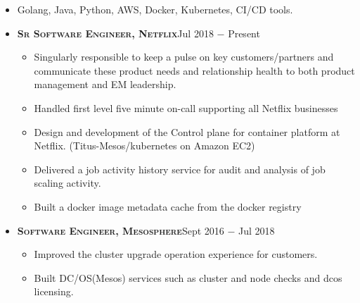 \documentclass[10pt,oneside]{article}
\newcommand{\subheader}[1]{\textsc{\textbf{\large{#1}}}}
\begin{document}
{\flushleft{\subheader{Skills}} %
      \vspace{-4 pt}

   \begin{itemize}
       \item Golang, Java, Python, AWS, Docker, Kubernetes, CI/CD tools.
   \end{itemize}

{\flushleft{\subheader{Experience}} %
\begin{itemize}
      \item
      \subheader{Sr Software Engineer, Netflix}\hfill Jul 2018 $-$ Present\\
      \vspace{-4 pt}
      \begin{itemize}
          \item Singularly responsible to keep a pulse on key customers/partners and communicate these product needs and relationship health to both product management and EM leadership.
          \item Handled first level five minute on-call supporting all Netflix businesses
          \item Design and development of the Control plane for container platform at Netflix. (Titus-Mesos/kubernetes on Amazon EC2)
          \item Delivered a job activity history service for audit and analysis of job scaling activity.
          \item Built a docker image metadata cache from the docker registry
      \end{itemize}
  
      \item
      \subheader{Software Engineer, Mesosphere}\hfill Sept 2016 $-$ Jul 2018\\
      \vspace{-4 pt}
      \begin{itemize}
        \item Improved the cluster upgrade operation experience for customers.
	    \item Built DC/OS(Mesos) services such as cluster and node checks and dcos licensing.
      \end{itemize}
      

\end{itemize}}}
\end{document}
